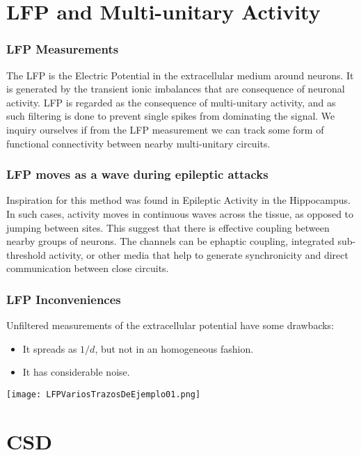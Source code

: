 \documentclass[10pt]{beamer}
\begin{document}
\section{LFP and Multi-unitary Activity}

\begin{frame}
  \frametitle{LFP Measurements}
  {\small The LFP is the Electric Potential in
  the extracellular medium around neurons. It is generated
  by the transient ionic imbalances that are consequence
  of neuronal activity. LFP is regarded as the consequence
  of multi-unitary activity, and as such filtering
  is done to prevent single spikes from dominating the signal.
  We inquiry ourselves if from the LFP measurement we can
  track some form of functional connectivity between
  nearby multi-unitary circuits.}
\end{frame}


\begin{frame}
  \frametitle{LFP moves as a wave during epileptic attacks}
  Inspiration for this method was found in Epileptic Activity
  in the Hippocampus. In such cases, activity moves in continuous waves across
  the tissue, as opposed to jumping between sites. This suggest
  that there is effective coupling between nearby groups of
  neurons. The channels  can be  ephaptic coupling, integrated
  sub-threshold activity, or other media that help
  to generate synchronicity and direct communication between close
  circuits.
\end{frame}


\begin{frame}
  \frametitle{LFP Inconveniences}
  Unfiltered measurements of the extracellular potential
  have some drawbacks:
  \begin{itemize}
  \item It spreads as $1/d$, but not in an homogeneous fashion.
  \item It has considerable noise.
  \end{itemize}
    \begin{center}
  \texttt{[image: LFPVariosTrazosDeEjemplo01.png]}  
  \end{center}

\end{frame}


\section{CSD}
\end{document}
